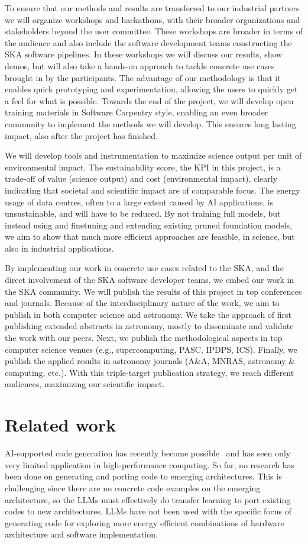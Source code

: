 \documentclass[a4wide,twocolumn]{article}
\begin{document}
To ensure that our methods and results are transferred to our industrial partners we will organize workshops and hackathons, with their broader organizations and stakeholders beyond the user committee. These workshops are broader in terms of the audience and also include the software development teams constructing the SKA software pipelines. In these workshops we will discuss our results, show demos, but will also take a hands-on approach to tackle concrete use cases brought in by the participants. The advantage of our methodology is that it enables quick prototyping and experimentation, allowing the users to quickly get a feel for what is possible. Towards the end of the project, we will develop open training materials in Software Carpentry style, enabling an even broader community to implement the methods we will develop. This ensures long lasting impact, also after the project has finished.

We will develop tools and instrumentation to maximize science output per unit of environmental impact. The sustainability score, the KPI in this project, is a trade-off of value (science output) and cost (environmental impact), clearly indicating that societal and scientific impact are of comparable focus. The energy usage of data centres, often to a large extent caused by AI applications, is unsustainable, and will have to be reduced. By not training full models, but instead using and finetuning and extending existing pruned foundation models, we aim to show that much more efficient approaches are feasible, in science, but also in industrial applications.

By implementing our work in concrete use cases related to the SKA, and the direct involvement of the SKA software developer teams, we embed our work in the SKA community. We will publish the results of this project in top conferences and journals. Because of the interdisciplinary nature of the work, we aim to publish in both computer science and astronomy. We take the approach of first publishing extended abstracts in astronomy, mostly to disseminate and validate the work with our peers. Next, we publish the methodological aspects in top computer science venues (e.g., supercomputing, PASC, IPDPS, ICS). Finally, we publish the applied results in astronomy journals (A\&A, MNRAS, astronomy \& computing, etc.). With this triple-target publication strategy, we reach different audiences, maximizing our scientific impact. 

\section{Related work}
AI-supported code generation has recently become possible~\cite{austin_program_2021,wang_codet5_2021} and has seen only very limited application in high-performance computing. So far, no research has been done on generating and porting code to emerging architectures. This is challenging since there are no concrete code examples on the emerging architecture, so the LLMs must effectively do transfer learning to port existing codes to new architectures. LLMs have not been used with the specific focus of generating code for exploring more energy efficient combinations of hardware architecture and software implementation.
\end{document}
